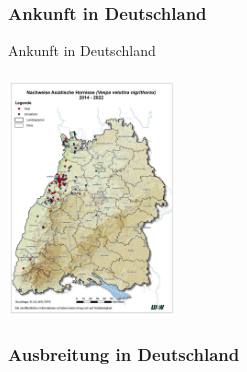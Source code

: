\documentclass[aspectratio=169]{beamer}
\begin{document}
\subsubsection[Ankunft in Deutschland]{Ankunft in Deutschland}

\begin{frame}{Ankunft in Deutschland}
	\framesubtitle{}

		\begin{center}	
			\includegraphics[width=0.33\textwidth]{figures/Asiatische Hornisse Verbreitung 2014-2022_900x1272.jpg}
		\end{center}
\end{frame}

\subsubsection[Ankunft in Deutschland]{Ausbreitung in Deutschland}
\end{document}
